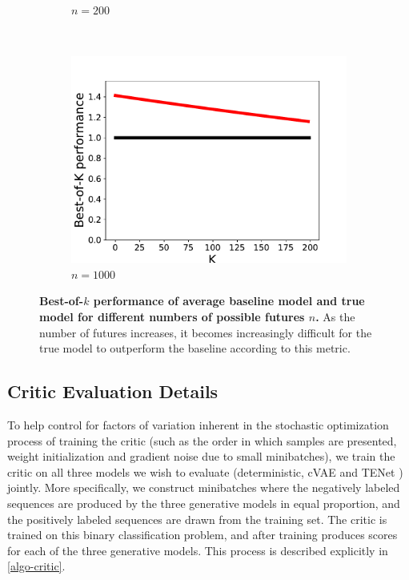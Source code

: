 \documentclass{article}
\newcommand{\modelname}{TENet }
\begin{document}
\begin{appendices}
\begin{figure}
\begin{subfigure}[b]{0.3\textwidth}
    \caption{$n=200$}
    \label{fig:tiger}
  \end{subfigure}
  ~ %
  \begin{subfigure}[b]{0.3\textwidth}
    \includegraphics[width=\textwidth]{images/best_of_k_toy_n1000.pdf}
    \caption{$n=1000$}
    \label{fig:mouse}
  \end{subfigure}
  \caption{
    \textbf{Best-of-$k$ performance of average baseline model and true model for different numbers of possible futures $n$.}
    As the number of futures increases, it becomes increasingly difficult for the true model to outperform the baseline according to this metric.}
  \label{expected-loss}
\end{figure}




\subsection{Critic Evaluation Details}
\label{critic-details}

To help control for factors of variation inherent in the stochastic optimization process of training the critic (such as the order in which samples are presented, weight initialization and gradient noise due to small minibatches), we train the critic on all three models we wish to evaluate (deterministic, cVAE and \modelname) jointly.
More specifically, we construct minibatches where the negatively labeled sequences are produced by the three generative models in equal proportion, and the positively labeled sequences are drawn from the training set.
The critic is trained on this binary classification problem, and after training produces scores for each of the three generative models.
This process is described explicitly in \cref{algo-critic}.


\end{appendices}
\end{document}
